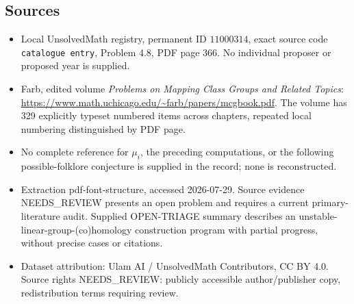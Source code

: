 \documentclass[11pt]{article}
\begin{document}
\subsection{Sources}
\begin{itemize}
\item Local UnsolvedMath registry, permanent ID \(11000314\), exact source code \texttt{catalogue entry}, Problem 4.8, PDF page 366. No individual proposer or proposed year is supplied.
\item Farb, edited volume \emph{Problems on Mapping Class Groups and Related Topics}: \url{https://www.math.uchicago.edu/~farb/papers/mcgbook.pdf}. The volume has 329 explicitly typeset numbered items across chapters, repeated local numbering distinguished by PDF page.
\item No complete reference for \(\mu_i\), the preceding computations, or the following possible-folklore conjecture is supplied in the record; none is reconstructed.
\item Extraction pdf-font-structure, accessed 2026-07-29. Source evidence NEEDS\_REVIEW presents an open problem and requires a current primary-literature audit. Supplied OPEN-TRIAGE summary describes an unstable-linear-group-(co)homology construction program with partial progress, without precise cases or citations.
\item Dataset attribution: Ulam AI / UnsolvedMath Contributors, CC BY 4.0. Source rights NEEDS\_REVIEW: publicly accessible author/publisher copy, redistribution terms requiring review.
\end{itemize}
\end{document}
